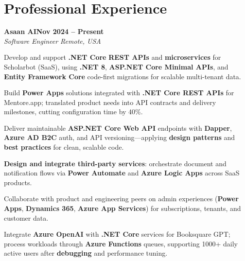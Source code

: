 \documentclass[letterpaper,10pt]{article}
\newcommand{\headingBf}[2]{
  \hspace{10pt}\textbf{#1}\hfill\textbf{#2}\\
}
\newcommand{\headingIt}[2]{
  \hspace{10pt}\textit{#1}\hfill\textit{#2}\\
}
\newenvironment{resume_list}{
  \vspace{-7pt}
  \begin{itemize}[itemsep=-2px, parsep=1pt, leftmargin=30pt]
}{
  \end{itemize}
}
\begin{document}
\section{Professional Experience}

\headingBf{Asaan AI}{Nov 2024 -- Present}
\headingIt{Software Engineer \hfill Remote, USA}{}
\begin{resume_list}
    \item Develop and support \textbf{.NET Core} \textbf{REST APIs} and \textbf{microservices} for Scholarbot (SaaS), using \textbf{.NET 8}, \textbf{ASP.NET Core Minimal APIs}, and \textbf{Entity Framework Core} code-first migrations for scalable multi-tenant data.
    \item Build \textbf{Power Apps} solutions integrated with \textbf{.NET Core REST APIs} for Mentore.app; translated product needs into API contracts and delivery milestones, cutting configuration time by 40\%.
    \item Deliver maintainable \textbf{ASP.NET Core Web API} endpoints with \textbf{Dapper}, \textbf{Azure AD B2C} auth, and API versioning---applying \textbf{design patterns} and \textbf{best practices} for clean, scalable code.
    \item \textbf{Design and integrate third-party services}: orchestrate document and notification flows via \textbf{Power Automate} and \textbf{Azure Logic Apps} across SaaS products.
    \item Collaborate with product and engineering peers on admin experiences (\textbf{Power Apps}, \textbf{Dynamics 365}, \textbf{Azure App Services}) for subscriptions, tenants, and customer data.
    \item Integrate \textbf{Azure OpenAI} with \textbf{.NET Core} services for Booksquare GPT; process workloads through \textbf{Azure Functions} queues, supporting 1000+ daily active users after \textbf{debugging} and performance tuning.
\end{resume_list}
\end{document}
